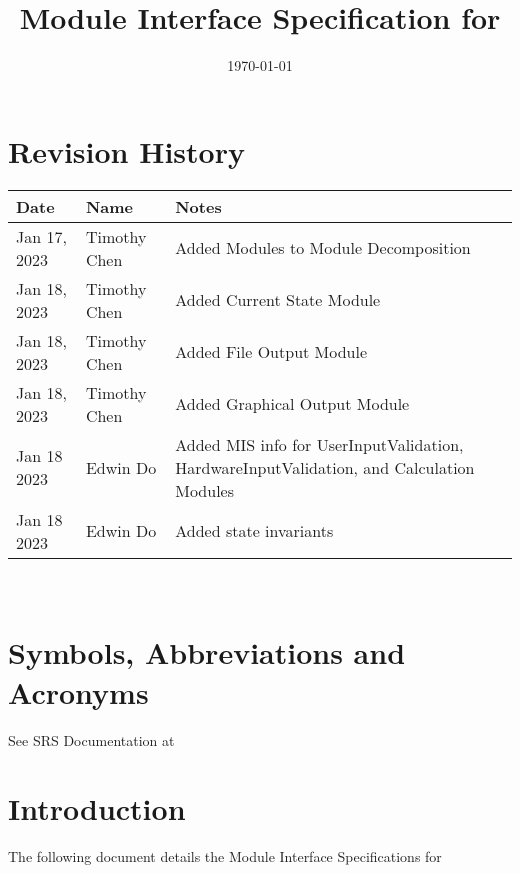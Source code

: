 \documentclass[12pt, titlepage]{article}
\begin{document}
\title{Module Interface Specification for \progname{}}

\author{\authname}

\date{\today}

\maketitle


\section{Revision History}

\begin{tabularx}{\textwidth}{p{3cm}p{2cm}X}
\toprule {\bf Date} & {\bf Name} & {\bf Notes}\\
\midrule
Jan 17, 2023 & Timothy Chen & Added Modules to Module Decomposition\\
Jan 18, 2023 & Timothy Chen & Added Current State Module \\
Jan 18, 2023 & Timothy Chen & Added File Output Module \\
Jan 18, 2023 & Timothy Chen & Added Graphical Output Module \\
Jan 18 2023 & Edwin Do & Added MIS info for UserInputValidation, HardwareInputValidation, and Calculation Modules\\
Jan 18 2023 & Edwin Do & Added state invariants\\
\bottomrule
\end{tabularx}

~\newpage

\section{Symbols, Abbreviations and Acronyms}

See SRS Documentation at 


\newpage

\tableofcontents

\newpage


\section{Introduction}

The following document details the Module Interface Specifications for
\end{document}
